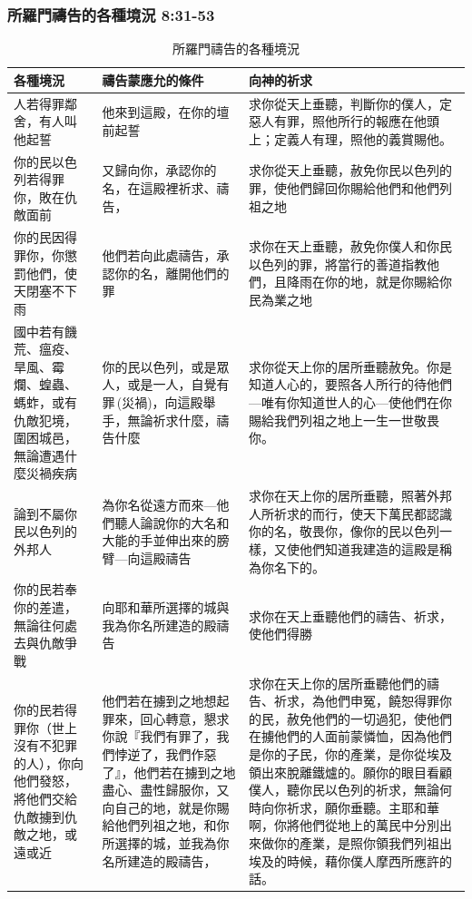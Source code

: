\subsubsection{所羅門禱告的各種境況 8:31-53}
\begin{table}[!hbp]
\vspace{-7mm}
\centering 
\begin{tabular}{p{3.75cm}|p{4.65cm}|p{8.5cm}}\hline\hline
各種境況 & 禱告蒙應允的條件 & 向神的祈求\\\hline\hline
人若得罪鄰舍，有人叫他起誓&他來到這殿，在你的壇前起誓&求你從天上垂聽，判斷你的僕人，定惡人有罪，照他所行的報應在他頭上；定義人有理，照他的義賞賜他。\\\hline
你的民以色列若得罪你，敗在仇敵面前&又歸向你，承認你的名，在這殿裡祈求、禱告，&求你從天上垂聽，赦免你民以色列的罪，使他們歸回你賜給他們和他們列祖之地\\\hline
你的民因得罪你，你懲罰他們，使天閉塞不下雨&他們若向此處禱告，承認你的名，離開他們的罪&求你在天上垂聽，赦免你僕人和你民以色列的罪，將當行的善道指教他們，且降雨在你的地，就是你賜給你民為業之地\\\hline
國中若有饑荒、瘟疫、旱風、霉爛、蝗蟲、螞蚱，或有仇敵犯境，圍困城邑，無論遭遇什麼災禍疾病&你的民以色列，或是眾人，或是一人，自覺有罪 (災禍)，向這殿舉手，無論祈求什麼，禱告什麼&求你從天上你的居所垂聽赦免。你是知道人心的，要照各人所行的待他們—唯有你知道世人的心—使他們在你賜給我們列祖之地上一生一世敬畏你。\\\hline
論到不屬你民以色列的外邦人&為你名從遠方而來—他們聽人論說你的大名和大能的手並伸出來的膀臂—向這殿禱告&求你在天上你的居所垂聽，照著外邦人所祈求的而行，使天下萬民都認識你的名，敬畏你，像你的民以色列一樣，又使他們知道我建造的這殿是稱為你名下的。\\\hline
你的民若奉你的差遣，無論往何處去與仇敵爭戰&向耶和華所選擇的城與我為你名所建造的殿禱告&求你在天上垂聽他們的禱告、祈求，使他們得勝\\\hline
你的民若得罪你（世上沒有不犯罪的人），你向他們發怒，將他們交給仇敵擄到仇敵之地，或遠或近&他們若在擄到之地想起罪來，回心轉意，懇求你說『我們有罪了，我們悖逆了，我們作惡了』，他們若在擄到之地盡心、盡性歸服你，又向自己的地，就是你賜給他們列祖之地，和你所選擇的城，並我為你名所建造的殿禱告，&求你在天上你的居所垂聽他們的禱告、祈求，為他們申冤，饒恕得罪你的民，赦免他們的一切過犯，使他們在擄他們的人面前蒙憐恤，因為他們是你的子民，你的產業，是你從埃及領出來脫離鐵爐的。願你的眼目看顧僕人，聽你民以色列的祈求，無論何時向你祈求，願你垂聽。主耶和華啊，你將他們從地上的萬民中分別出來做你的產業，是照你領我們列祖出埃及的時候，藉你僕人摩西所應許的話。\\\hline
\end{tabular}
\caption{所羅門禱告的各種境況}
\end{table}

